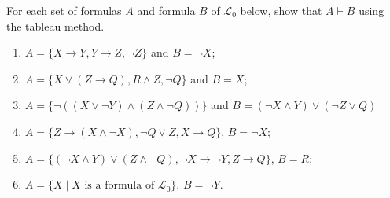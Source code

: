 \begin{exc}
For each set of formulas $A$ and formula $B$ of $\mathcal{L}_0$ below, show that $A \vdash B$ using the tableau method. 

\begin{enumerate}
	\item $A=\{X \rightarrow Y, Y \rightarrow Z, \neg Z\}$ and $B=\neg X$;
	\item $A=\{X \vee (Z \rightarrow Q), R \wedge Z, \neg Q\}$ and $B=X$;
	\item $A=\{\neg ((X \vee \neg Y) \wedge (Z \wedge \neg Q))\}$ and $B=(\neg X \wedge Y) \vee (\neg Z \vee Q)$
	\item $A=\{Z \rightarrow (X \wedge \neg X), \neg Q \vee Z, X \rightarrow Q\}$, $B=\neg X$;
	\item $A=\{(\neg X \wedge Y) \vee (Z \wedge \neg Q), \neg X \rightarrow \neg Y, Z \rightarrow Q\}$, $B=R$;
	\item $A=\{X \mid X\text{ is a formula of }\mathcal{L}_0\}$, $B=\neg Y$.
	\end{enumerate} 
\end{exc}
